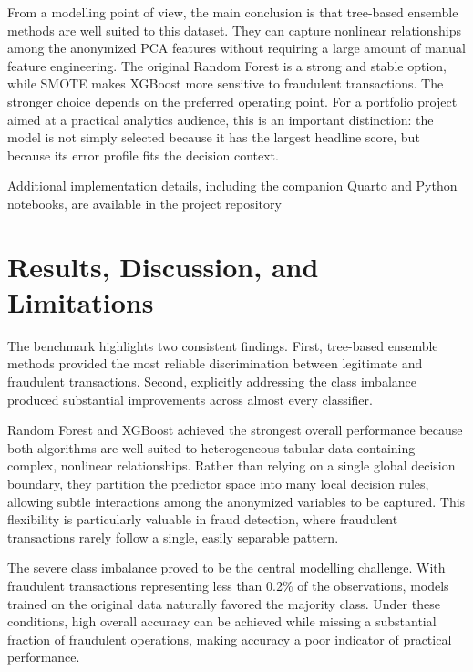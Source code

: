 \documentclass[
  12pt,
  letterpaper,
]{book}
\begin{document}
From a modelling point of view, the main conclusion is that tree-based
ensemble methods are well suited to this dataset. They can capture
nonlinear relationships among the anonymized PCA features without
requiring a large amount of manual feature engineering. The original
Random Forest is a strong and stable option, while SMOTE makes XGBoost
more sensitive to fraudulent transactions. The stronger choice depends
on the preferred operating point. For a portfolio project aimed at a
practical analytics audience, this is an important distinction: the
model is not simply selected because it has the largest headline score,
but because its error profile fits the decision context.

Additional implementation details, including the companion Quarto and
Python notebooks, are available in the project repository
\href{https://github.com/rodrigokang/portfolio/tree/main/notebooks-and-scripts/2-retail-analytics/1-credit-card-fraud-detection-ml-benchmark}{\faGithub}

\section{Results, Discussion, and
Limitations}\label{results-discussion-and-limitations-3}

The benchmark highlights two consistent findings. First, tree-based
ensemble methods provided the most reliable discrimination between
legitimate and fraudulent transactions. Second, explicitly addressing
the class imbalance produced substantial improvements across almost
every classifier.

Random Forest and XGBoost achieved the strongest overall performance
because both algorithms are well suited to heterogeneous tabular data
containing complex, nonlinear relationships. Rather than relying on a
single global decision boundary, they partition the predictor space into
many local decision rules, allowing subtle interactions among the
anonymized variables to be captured. This flexibility is particularly
valuable in fraud detection, where fraudulent transactions rarely follow
a single, easily separable pattern.

The severe class imbalance proved to be the central modelling challenge.
With fraudulent transactions representing less than 0.2\% of the
observations, models trained on the original data naturally favored the
majority class. Under these conditions, high overall accuracy can be
achieved while missing a substantial fraction of fraudulent operations,
making accuracy a poor indicator of practical performance.
\end{document}
